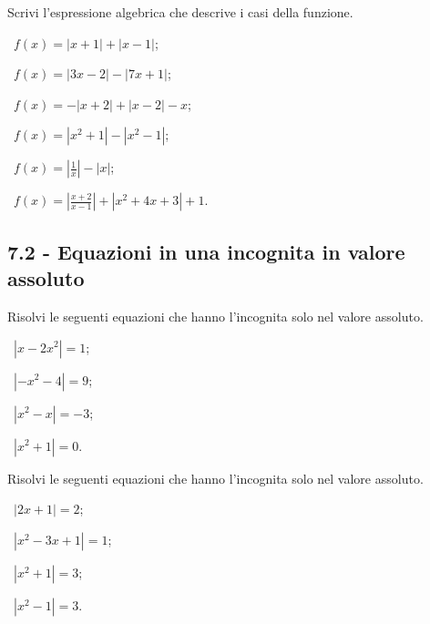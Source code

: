 \begin{esercizio}[\Ast]
 \label{ese:7.3}
Scrivi l'espressione algebrica che descrive i casi della funzione.
\begin{multicols}{2}
 \begin{enumeratea}
 \item~$ f(x)=\left|x+1\right|+\left|x-1\right| $;
 \item~$ f(x)=\left|3x-2\right|-\left|7x+1\right| $;
 \item~$ f(x)=-\left|x+2\right|+\left|x-2\right|-x $;
 \item~$f(x)=\left|x^2+1\right|-\left|x^2-1\right|$;
 \item~$f(x)=\left|\frac 1 x\right|-\left|x\right|$;
 \item~$f(x)=\left|\frac{x+2}{x-1}\right|+\left|x^2+4x+3\right|+1$.
 \end{enumeratea}
 \end{multicols}
\end{esercizio}

\subsection*{7.2 - Equazioni in una incognita in valore assoluto}

\begin{esercizio}[\Ast]
 \label{ese:7.4}
Risolvi le seguenti equazioni che hanno l'incognita solo nel valore assoluto.
\begin{multicols}{2}
 \begin{enumeratea}
 \item~$\left|x-2x^2\right|=1$;
 \item~$\left|-x^2-4\right|=9$;
 \item~$\left|x^2-x\right|=-3$;
 \item~$\left|x^2+1\right|=0$.
 \end{enumeratea}
 \end{multicols}
\end{esercizio}

\begin{esercizio}[\Ast]
 \label{ese:7.5}
Risolvi le seguenti equazioni che hanno l'incognita solo nel valore assoluto.
\begin{multicols}{2}
 \begin{enumeratea}
 \item~$\left|2x+1\right|=2$;
 \item~$\left|x^2-3x+1\right|=1$;
 \item~$\left|x^2+1\right|=3$;
 \item~$\left|x^2-1\right|=3$.
 \end{enumeratea}
 \end{multicols}
\end{esercizio}


